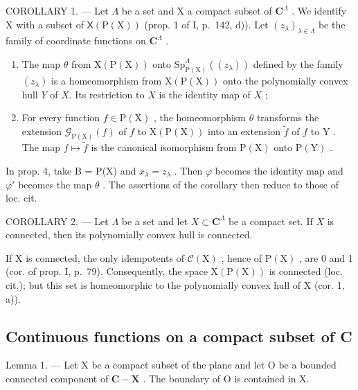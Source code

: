 COROLLARY 1. --- Let \(\Lambda\) be a set and X a compact subset of \(\mathbf{C}^{\Lambda}\) . We identify X with a subset of \(\mathsf{X}(\mathrm{P}(\mathrm{X}))\) (prop. 1 of I, p.~142, d)). Let \((z_{\lambda})_{\lambda \in \Lambda}\) be the family of coordinate functions on \(\mathbf{C}^{\Lambda}\) .

\begin{enumerate}
\def\labelenumi{\alph{enumi})}
\item
  The map \(\theta\) from \(\mathrm{X}(\mathrm{P}(\mathrm{X}))\) onto \(\mathrm{Sp}_{\mathrm{P}(\mathrm{X})}^{\Lambda}((z_{\lambda}))\) defined by the family \((z_{\lambda})\) is a homeomorphism from \(\mathrm{X}(\mathrm{P}(\mathrm{X}))\) onto the polynomially convex hull \(Y\) of \(X\). Its restriction to \(X\) is the identity map of \(X\) ;
\item
  For every function \(f \in \mathrm{P}(\mathrm{X})\) , the homeomorphism \(\theta\) transforms the extension \(\mathcal{G}_{\mathrm{P}(\mathrm{X})}(f)\) of \(f\) to \(\mathrm{X}(\mathrm{P}(\mathrm{X}))\) into an extension \(\widetilde{f}\) of \(f\) to \(\mathrm{Y}\) . The map \(f \mapsto \widetilde{f}\) is the canonical isomorphism from \(\mathrm{P}(\mathrm{X})\) onto \(\mathrm{P}(\mathrm{Y})\) .
\end{enumerate}

In prop. 4, take B = P(X) and \(x_{\lambda} = z_{\lambda}\) . Then \(\varphi\) becomes the identity map and \(\varphi'\) becomes the map \(\theta\) . The assertions of the corollary then reduce to those of loc. cit.

COROLLARY 2. --- Let \(\Lambda\) be a set and let \(X \subset \mathbf{C}^{\Lambda}\) be a compact set. If \(X\) is connected, then its polynomially convex hull is connected.

If X is connected, the only idempotents of \(\mathcal{C}(\mathrm{X})\) , hence of \(\mathrm{P}(\mathrm{X})\) , are 0 and 1 (cor. of prop. I, p.~79). Consequently, the space \(\mathrm{X}(\mathrm{P}(\mathrm{X}))\) is connected (loc. cit.); but this set is homeomorphic to the polynomially convex hull of X (cor. 1, a)).

\subsection{Continuous functions on a compact subset of C}

Lemma 1. --- Let X be a compact subset of the plane and let O be a bounded connected component of \(\mathbf{C} - \mathbf{X}\) . The boundary of O is contained in X.

